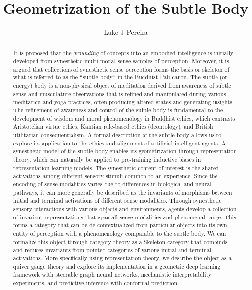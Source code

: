 \documentclass{article}
\title{\vspace{-3cm} Geometrization of the Subtle Body}
\author{Luke J Pereira}
\date{}
\theoremstyle{definition}
\begin{document}
\maketitle
\begin{abstract}
\noindent
It is proposed that the \textit{grounding} of concepts into an embodied intelligence is initially developed from synesthetic multi-modal sense samples of perception.
Moreover, it is argued that collections of synesthetic sense perception forms the basis or skeleton of what is referred to as the ``subtle body'' in the Buddhist Pali canon.
The subtle (or energy) body is a non-physical object of meditation derived from awareness of subtle sense and musculature observations that is refined and manipulated during various meditation and yoga practices, often producing altered states and generating insights.
The refinement of awareness and control of the subtle body is fundamental to the development of wisdom and moral phenomenology in Buddhist ethics, which contrasts Aristotelian virtue ethics, Kantian rule-based ethics (deontology), and British utilitarian consequentialism.
A formal description of the subtle body allows us to explore its application to the ethics and alignment of artificial intelligent agents.
A synesthetic model of the subtle body enables its geometrization through representation theory, which can naturally be applied to pre-training inductive biases in representation learning models.
The synesthetic content of interest is the shared activations among different sensory stimuli common to an experience. 
Since the encoding of sense modalities varies due to differences in biological and neural pathways, it can more generally be described as the invariants of morphisms between initial and terminal activations of different sense modalities.
Through synesthetic sensory interactions with various objects and environments, agents develop a collection of invariant representations that span all sense modalities and phenomenal range. 
This forms a category that can be de-contextualized from particular objects into its own entity of perception with a phenomenology comparable to the subtle body. 
We can formalize this object through category theory as a Skeleton category that combinds and reduces invariants from pointed categories of various initial and terminal activations.
More specifically using representation theory, we describe the object as a quiver gauge theory and explore its implementation in a geometric deep learning framework with steerable graph neural networks, mechanistic interpretability experiments, and predictive inference with conformal prediction.
\end{abstract}
\end{document}
